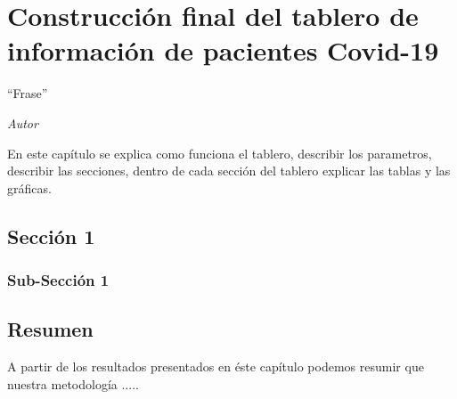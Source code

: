 \chapter{Construcción final del tablero de información de pacientes Covid-19}\label{cap:resultados}

\epigraph{``Frase''
}{\textit{ Autor }}

En este capítulo se explica como funciona el tablero, describir los parametros, describir las secciones, dentro de cada sección del tablero explicar las tablas y las gráficas.

\section{Sección 1}


\subsection{Sub-Sección 1}


\section{Resumen}
A partir de los resultados presentados en éste capítulo podemos resumir que nuestra metodología .....